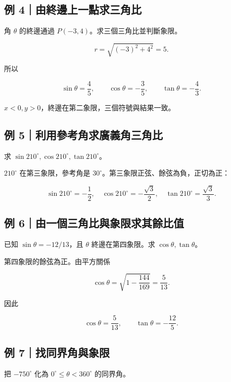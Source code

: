 \documentclass[11pt,a4paper]{article}
\begin{document}
\subsection{例 4｜由終邊上一點求三角比}\label{ux4f8b-4ux7531ux7d42ux908aux4e0aux4e00ux9edeux6c42ux4e09ux89d2ux6bd4}

角 \(\theta\) 的終邊通過 \(P(-3,4)\)。求三個三角比並判斷象限。

\[
r=\sqrt{(-3)^2+4^2}=5.
\]

所以

\[
\boxed{\sin\theta=\frac45},\qquad
\boxed{\cos\theta=-\frac35},\qquad
\boxed{\tan\theta=-\frac43}.
\]

\(x<0,y>0\)，終邊在第二象限，三個符號與結果一致。

\subsection{例 5｜利用參考角求廣義角三角比}\label{ux4f8b-5ux5229ux7528ux53c3ux8003ux89d2ux6c42ux5ee3ux7fa9ux89d2ux4e09ux89d2ux6bd4}

求 \(\sin210^\circ,\cos210^\circ,\tan210^\circ\)。

\(210^\circ\) 在第三象限，參考角是 \(30^\circ\)。第三象限正弦、餘弦為負，正切為正：

\[
\boxed{\sin210^\circ=-\frac12},\quad
\boxed{\cos210^\circ=-\frac{\sqrt3}{2}},\quad
\boxed{\tan210^\circ=\frac{\sqrt3}{3}}.
\]

\subsection{例 6｜由一個三角比與象限求其餘比值}\label{ux4f8b-6ux7531ux4e00ux500bux4e09ux89d2ux6bd4ux8207ux8c61ux9650ux6c42ux5176ux9918ux6bd4ux503c}

已知 \(\sin\theta=-12/13\)，且 \(\theta\) 終邊在第四象限。求 \(\cos\theta,\tan\theta\)。

第四象限的餘弦為正。由平方關係

\[
\cos\theta=\sqrt{1-\frac{144}{169}}=\frac5{13}.
\]

因此

\[
\boxed{\cos\theta=\frac5{13}},\qquad
\boxed{\tan\theta=-\frac{12}{5}}.
\]

\subsection{例 7｜找同界角與象限}\label{ux4f8b-7ux627eux540cux754cux89d2ux8207ux8c61ux9650}

把 \(-750^\circ\) 化為 \(0^\circ\le\theta<360^\circ\) 的同界角。
\end{document}
